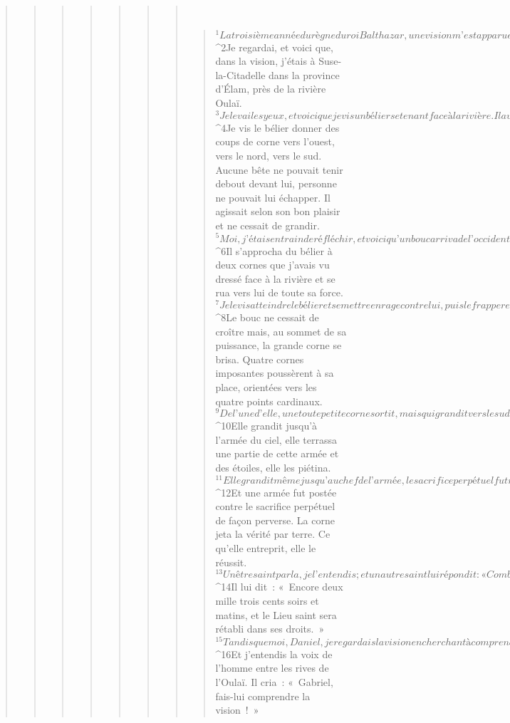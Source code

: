 \begin{verse}
\begin{verse}
\begin{verse}
\begin{verse}
\begin{verse}
\begin{verse}
\begin{verse}
         
      \bchapter{}
      \begin{verse}
${}^{1}La troisième année du règne du roi Balthazar, une vision m’est apparue, à moi, Daniel, après celle qui m’était apparue précédemment. 
${}^{2}Je regardai, et voici que, dans la vision, j’étais à Suse-la-Citadelle dans la province d’Élam, près de la rivière Oulaï. 
${}^{3}Je levai les yeux, et voici que je vis un bélier se tenant face à la rivière. Il avait deux cornes, deux hautes cornes, mais l’une plus haute que l’autre, et la plus haute se dressa en dernier. 
${}^{4}Je vis le bélier donner des coups de corne vers l’ouest, vers le nord, vers le sud. Aucune bête ne pouvait tenir debout devant lui, personne ne pouvait lui échapper. Il agissait selon son bon plaisir et ne cessait de grandir.
${}^{5}Moi, j’étais en train de réfléchir, et voici qu’un bouc arriva de l’occident, survolant toute la terre sans toucher le sol. Il avait une corne imposante entre les yeux. 
${}^{6}Il s’approcha du bélier à deux cornes que j’avais vu dressé face à la rivière et se rua vers lui de toute sa force. 
${}^{7}Je le vis atteindre le bélier et se mettre en rage contre lui, puis le frapper et briser ses deux cornes. Le bélier n’avait pas la force de lui faire face. Il le jeta à terre et le piétina. Personne ne pouvait en délivrer le bélier. 
${}^{8}Le bouc ne cessait de croître mais, au sommet de sa puissance, la grande corne se brisa. Quatre cornes imposantes poussèrent à sa place, orientées vers les quatre points cardinaux. 
${}^{9}De l’une d’elle, une toute petite corne sortit, mais qui grandit vers le sud, vers l’est, et vers le Pays magnifique. 
${}^{10}Elle grandit jusqu’à l’armée du ciel, elle terrassa une partie de cette armée et des étoiles, elle les piétina. 
${}^{11}Elle grandit même jusqu’au chef de l’armée, le sacrifice perpétuel fut retiré à celui-ci, et les fondations de son Lieu saint furent renversées. 
${}^{12}Et une armée fut postée contre le sacrifice perpétuel de façon perverse. La corne jeta la vérité par terre. Ce qu’elle entreprit, elle le réussit.
       
${}^{13}Un être saint parla, je l’entendis ; et un autre saint lui répondit : « Combien de temps verrons-nous le sacrifice perpétuel retiré, la perversité dévastatrice, le sanctuaire livré, l’armée piétinée ? » 
${}^{14}Il lui dit : « Encore deux mille trois cents soirs et matins, et le Lieu saint sera rétabli dans ses droits. »
${}^{15}Tandis que moi, Daniel, je regardais la vision en cherchant à comprendre, voici que se tenait en face de moi quelqu’un ayant l’apparence d’un homme. 
${}^{16}Et j’entendis la voix de l’homme entre les rives de l’Oulaï. Il cria : « Gabriel, fais-lui comprendre la vision ! » 

\end{verse}
\end{verse}
\end{verse}
\end{verse}
\end{verse}
\end{verse}
\end{verse}
\end{verse}
